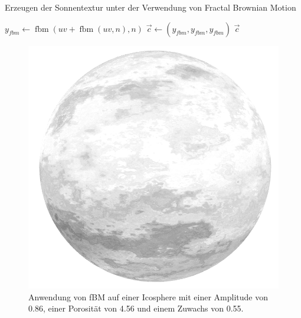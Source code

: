 \begin{algorithm}
  \caption{Erzeugen der Sonnentextur unter der Verwendung von Fractal Brownian
  Motion}
  \label{alg:suntexture}
  \SetAlgoLined

  \BlankLine
  $y_\mathit{fbm} \leftarrow \operatorname{fbm}(\mathit{uv} +
    \operatorname{fbm}(\mathit{uv}, n), n)$\;
  $\vec{c} \leftarrow (y_\mathit{fbm}, y_\mathit{fbm}, y_\mathit{fbm})$\;
  \Return $\vec{c}$\;
\end{algorithm}

\begin{figure}
  \includegraphics[width=0.6\columnwidth]{fbm-sphere}
  \caption{Anwendung von fBM auf einer Icosphere mit einer Amplitude von 0.86, einer Porosität von 4.56 und einem Zuwachs von 0.55.}
\end{figure}
